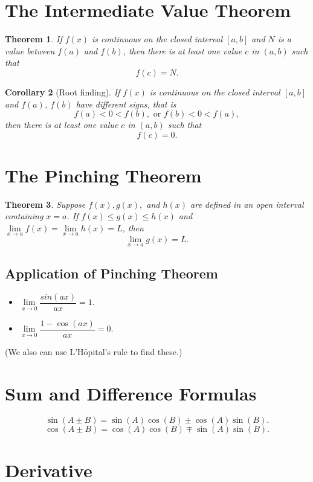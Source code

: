 \documentclass[12pt]{article}
\newtheorem{theorem}{\bf Theorem}[section]
\newtheorem{corollary}[theorem]{Corollary}
\begin{document}
\section{The Intermediate Value Theorem}

\begin{theorem}
If $f(x)$ is continuous on the closed interval $[a,b]$ and $N$ is a value between $f(a)$ and $f(b)$,
then there is at least one value $c$ in $(a,b)$ such that
$$f(c)=N.$$
\end{theorem}

\begin{corollary}[Root finding]
If $f(x)$ is continuous on the closed interval $[a,b]$ and $f(a)$, $f(b)$ have different signs, that is
$$f(a) < 0 <f(b), \text{ or } f(b) < 0 <f(a),$$
then there is at least one value $c$ in $(a,b)$ such that
$$f(c)=0.$$
\end{corollary}

\section{The Pinching Theorem}
\begin{theorem}
Suppose $f(x), g(x),$ and $h(x)$ are defined in an open interval containing $x=a$.
If $f(x) \leq g(x) \leq h(x)$  and $\lim\limits_{x\to a} f(x)=\lim\limits_{x\to a} h(x)=L$, then
$$\lim\limits_{x\to a} g(x)=L.$$
\end{theorem}

\subsection{Application of Pinching Theorem}
\begin{itemize}
\item $\lim\limits_{x\to 0} \dfrac{sin(ax)}{ax}=1.$

\item $\lim\limits_{x\to 0} \dfrac{1-\cos(ax)}{ax}=0.$
\end{itemize}
(We also can use L'H$\hat{\text{o}}$pital's rule to find these.)

\section{Sum and Difference Formulas}
$$ \sin(A \pm B)=\sin(A)\cos(B) \pm \cos(A)\sin(B). $$
$$ \cos(A \pm B)=\cos(A)\cos(B) \mp \sin(A)\sin(B).$$

\section{Derivative}
\end{document}
